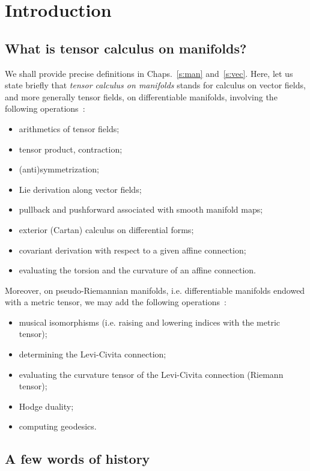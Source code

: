 \chapter{Introduction} \label{s:int}

\minitoc

\section{What is tensor calculus on manifolds?}

We shall provide precise definitions in
Chaps.~\ref{s:man} and~\ref{s:vec}. Here, let us state briefly that
\emph{tensor calculus on manifolds} stands for calculus on vector fields,
and more generally tensor fields, on differentiable manifolds, involving the following operations~\cite{Lee13}:
\begin{itemize}
\item arithmetics of tensor fields;
\item tensor product, contraction;
\item (anti)symmetrization;
\item Lie derivation along vector fields;
\item pullback and pushforward associated with smooth manifold maps;
\item exterior (Cartan) calculus on differential forms;
\item covariant derivation with respect to a given affine connection;
\item evaluating the torsion and the curvature of an affine connection.
\end{itemize}
Moreover, on pseudo-Riemannian manifolds, i.e. differentiable manifolds endowed
with a metric tensor, we may add the following
operations~\cite{Lee97,ONeil83}:
\begin{itemize}
\item musical isomorphisms (i.e. raising and lowering indices with the metric tensor);
\item determining the Levi-Civita connection;
\item evaluating the curvature tensor of the Levi-Civita connection (Riemann tensor);
\item Hodge duality;
\item computing geodesics.
\end{itemize}


\section{A few words of history}

